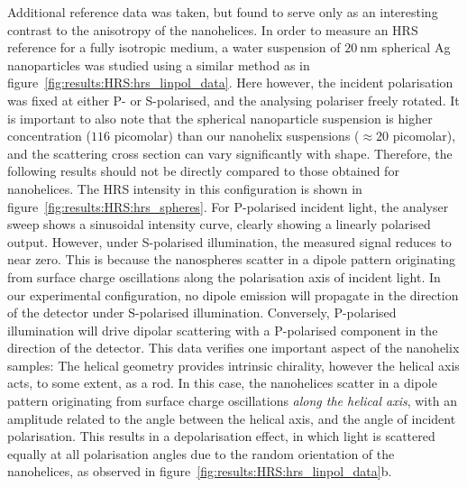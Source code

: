 Additional reference data was taken, but found to serve only as an interesting contrast to the anisotropy of the nanohelices. In order to measure an HRS reference for a fully isotropic medium, a water suspension of $\SI{20}{\nano\m}$ spherical Ag nanoparticles was studied using a similar method as in figure~\ref{fig:results:HRS:hrs_linpol_data}. Here however, the incident polarisation was fixed at either P- or S-polarised, and the analysing polariser freely rotated. 
It is important to also note that the spherical nanoparticle suspension is higher concentration ($116$ picomolar) than our nanohelix suspensions ($\approx 20$ picomolar), and the scattering cross section can vary significantly with shape.
Therefore, the following results should not be directly compared to those obtained for nanohelices.
The HRS intensity in this configuration is shown in figure~\ref{fig:results:HRS:hrs_spheres}. 
For P-polarised incident light, the analyser sweep shows a sinusoidal intensity curve, clearly showing a linearly polarised output. However, under S-polarised illumination, the measured signal reduces to near zero. This is because the nanospheres scatter in a dipole pattern originating from surface charge oscillations along the polarisation axis of incident light. 
In our experimental configuration, no dipole emission will propagate in the direction of the detector under S-polarised illumination. Conversely, P-polarised illumination will drive dipolar scattering with a P-polarised component in the direction of the detector. This data verifies one important aspect of the nanohelix samples: The helical geometry provides intrinsic chirality, however the helical axis acts, to some extent, as a rod. In this case, the nanohelices scatter in a dipole pattern originating from surface charge oscillations \textit{along the helical axis}, with an amplitude related to the angle between the helical axis, and the angle of incident polarisation. 
This results in a depolarisation effect, in which light is scattered equally at all polarisation angles due to the random orientation of the nanohelices, as observed in figure~\ref{fig:results:HRS:hrs_linpol_data}b.


